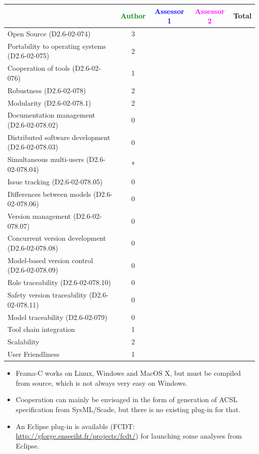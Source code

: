 \begin{tabular}{|l | c | c | c | c|}
\hline
& \textcolor{green}{Author} & \textcolor{blue}{Assessor 1} & \textcolor{magenta}{Assessor 2} & Total \\
\hline 
Open Source (D2.6-02-074) & 3 & & &  \\
\hline 
Portability to operating systems (D2.6-02-075) & 2 & & &  \\
\hline
Cooperation of tools (D2.6-02-076) & 1 & & &  \\
\hline
Robustness (D2.6-02-078) & 2 & & & \\
\hline
Modularity (D2.6-02-078.1) & 2 & & & \\
\hline
Documentation management (D2.6-02-078.02) & 0 & & & \\
\hline
Distributed software development (D2.6-02-078.03)  & 0 & & & \\
\hline
Simultaneous multi-users (D2.6-02-078.04)   & * & & & \\
\hline
Issue tracking (D2.6-02-078.05) & 0 & & & \\
\hline
Differences between models (D2.6-02-078.06) & 0 & & & \\
\hline
Version management (D2.6-02-078.07) & 0 & & & \\
\hline
Concurrent version development (D2.6-02-078.08) & 0 & & & \\
\hline
Model-based version control (D2.6-02-078.09) & 0 & & & \\
\hline
Role traceability (D2.6-02-078.10) & 0 & & & \\
\hline
Safety version traceability (D2.6-02-078.11) & 0 & & & \\
\hline
Model traceability (D2.6-02-079) & 0 & & & \\
\hline
Tool chain integration & 1 & & & \\
\hline
Scalability & 2 & & & \\
\hline
User Friendliness & 1 & & & \\
\hline
\end{tabular}

\begin{author_comment}
\begin{itemize}
\item Frama-C works on Linux, Windows and MacOS X, 
but must be compiled from source, which is not always very easy on Windows.
\item Cooperation can mainly be envisaged
in the form of generation of ACSL specification from SysML/Scade, but there is
no existing plug-in for that.
\item An Eclipse plug-in is available 
(FCDT: \url{http://gforge.enseeiht.fr/projects/fcdt/}) for launching some
analyses from Eclipse.
\end{itemize}
\end{author_comment}



